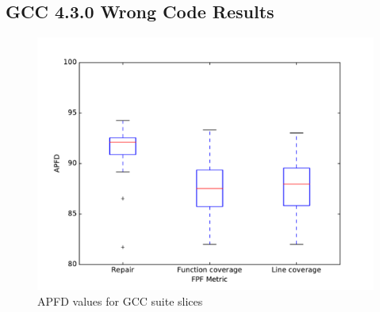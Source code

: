 

\subsection{GCC 4.3.0 Wrong Code Results}


\begin{figure}
  \centering
  \includegraphics[width=0.95\columnwidth]{comparegcc}
  \caption{APFD values for GCC suite slices}
  \label{comparegcc}
\end{figure}%

